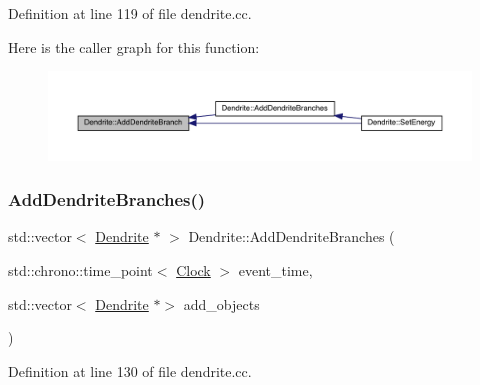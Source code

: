 Definition at line 119 of file dendrite.\+cc.

Here is the caller graph for this function\+:\nopagebreak
\begin{figure}[H]
\begin{center}
\leavevmode
\includegraphics[width=350pt]{class_dendrite_aab6cedff35cb8c65923b14c8034cccc0_icgraph}
\end{center}
\end{figure}
\mbox{\label{class_dendrite_a3e6a80da180b60290545cfc92f221a05}} 
\subsubsection{\texorpdfstring{Add\+Dendrite\+Branches()}{AddDendriteBranches()}}
{\footnotesize\ttfamily std\+::vector$<$ \hyperlink{class_dendrite}{Dendrite} $\ast$ $>$ Dendrite\+::\+Add\+Dendrite\+Branches (\begin{DoxyParamCaption}\item[{std\+::chrono\+::time\+\_\+point$<$ \hyperlink{universe_8h_a0ef8d951d1ca5ab3cfaf7ab4c7a6fd80}{Clock} $>$}]{event\+\_\+time,  }\item[{std\+::vector$<$ \hyperlink{class_dendrite}{Dendrite} $\ast$$>$}]{add\+\_\+objects }\end{DoxyParamCaption})}



Definition at line 130 of file dendrite.\+cc.

